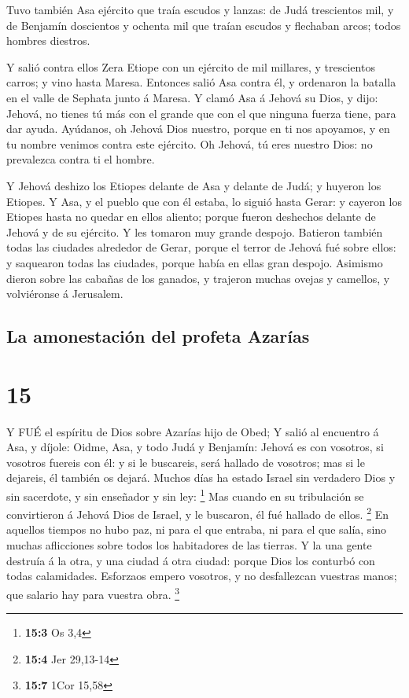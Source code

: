  Tuvo también Asa ejército que traía escudos y lanzas: de
Judá trescientos mil, y de Benjamín doscientos y ochenta mil que traían
escudos y flechaban arcos; todos hombres diestros.

 Y salió contra ellos Zera Etiope con un ejército de mil
millares, y trescientos carros; y vino hasta Maresa. 
Entonces salió Asa contra él, y ordenaron la batalla en el valle de
Sephata junto á Maresa.  Y clamó Asa á Jehová su Dios, y
dijo: Jehová, no tienes tú más con el grande que con el que ninguna
fuerza tiene, para dar ayuda. Ayúdanos, oh Jehová Dios nuestro, porque
en ti nos apoyamos, y en tu nombre venimos contra este ejército. Oh
Jehová, tú eres nuestro Dios: no prevalezca contra ti el hombre.

 Y Jehová deshizo los Etiopes delante de Asa y delante de
Judá; y huyeron los Etiopes.  Y Asa, y el pueblo que con él
estaba, lo siguió hasta Gerar: y cayeron los Etiopes hasta no quedar en
ellos aliento; porque fueron deshechos delante de Jehová y de su
ejército. Y les tomaron muy grande despojo.  Batieron
también todas las ciudades alrededor de Gerar, porque el terror de
Jehová fué sobre ellos: y saquearon todas las ciudades, porque había en
ellas gran despojo.  Asimismo dieron sobre las cabañas de
los ganados, y trajeron muchas ovejas y camellos, y volviéronse á
Jerusalem.

\hypertarget{la-amonestaciuxf3n-del-profeta-azaruxedas}{%
\subsection{La amonestación del profeta
Azarías}\label{la-amonestaciuxf3n-del-profeta-azaruxedas}}

\hypertarget{section-14}{%
\section{15}\label{section-14}}

 Y FUÉ el espíritu de Dios sobre Azarías hijo de Obed;
 Y salió al encuentro á Asa, y díjole: Oidme, Asa, y todo
Judá y Benjamín: Jehová es con vosotros, si vosotros fuereis con él: y
si le buscareis, será hallado de vosotros; mas si le dejareis, él
también os dejará.  Muchos días ha estado Israel sin
verdadero Dios y sin sacerdote, y sin enseñador y sin ley: \footnote{\textbf{15:3}
  Os 3,4}  Mas cuando en su tribulación se convirtieron á
Jehová Dios de Israel, y le buscaron, él fué hallado de ellos.
\footnote{\textbf{15:4} Jer 29,13-14}  En aquellos tiempos
no hubo paz, ni para el que entraba, ni para el que salía, sino muchas
aflicciones sobre todos los habitadores de las tierras.  Y
la una gente destruía á la otra, y una ciudad á otra ciudad: porque Dios
los conturbó con todas calamidades.  Esforzaos empero
vosotros, y no desfallezcan vuestras manos; que salario hay para vuestra
obra. \footnote{\textbf{15:7} 1Cor 15,58}

